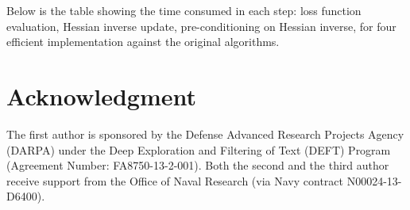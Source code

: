 \documentclass[conference]{IEEEtran}
\begin{document}
Below is the table showing the time consumed in each step: loss function evaluation, Hessian inverse update, pre-conditioning on Hessian inverse, for four efficient implementation against the original algorithms.




\section*{Acknowledgment}
The first author is sponsored by the Defense Advanced
Research Projects Agency (DARPA) under the Deep Exploration and
Filtering of Text (DEFT) Program (Agreement Number: FA8750-13-2-001).
Both the second and the third author receive support from the Office
of Naval Research (via Navy contract N00024-13-D6400).


\end{document}
